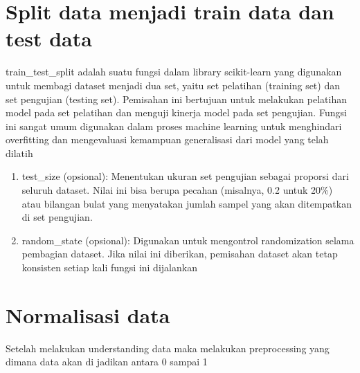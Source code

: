 \documentclass[
  letterpaper,
]{krantz}
\begin{document}

\hypertarget{split-data-menjadi-train-data-dan-test-data}{%
\section*{Split data menjadi train data dan test
data}\label{split-data-menjadi-train-data-dan-test-data}}


train\_test\_split adalah suatu fungsi dalam library scikit-learn yang
digunakan untuk membagi dataset menjadi dua set, yaitu set pelatihan
(training set) dan set pengujian (testing set). Pemisahan ini bertujuan
untuk melakukan pelatihan model pada set pelatihan dan menguji kinerja
model pada set pengujian. Fungsi ini sangat umum digunakan dalam proses
machine learning untuk menghindari overfitting dan mengevaluasi
kemampuan generalisasi dari model yang telah dilatih

\begin{enumerate}
\def\labelenumi{\arabic{enumi}.}
\item
  test\_size (opsional): Menentukan ukuran set pengujian sebagai
  proporsi dari seluruh dataset. Nilai ini bisa berupa pecahan
  (misalnya, 0.2 untuk 20\%) atau bilangan bulat yang menyatakan jumlah
  sampel yang akan ditempatkan di set pengujian.
\item
  random\_state (opsional): Digunakan untuk mengontrol randomization
  selama pembagian dataset. Jika nilai ini diberikan, pemisahan dataset
  akan tetap konsisten setiap kali fungsi ini dijalankan
\end{enumerate}

\hypertarget{normalisasi-data}{%
\section*{Normalisasi data}\label{normalisasi-data}}


Setelah melakukan understanding data maka melakukan preprocessing yang
dimana data akan di jadikan antara 0 sampai 1
\end{document}
